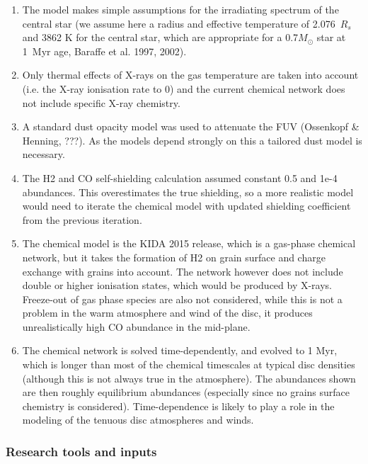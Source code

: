 \documentclass[10pt,fleqn,twoside]{article}
\newcommand{\Tcol}{\color{blue}}
\begin{document}
\begin{enumerate}
\item The model makes simple assumptions for the irradiating spectrum
of the central star (we assume here a radius and effective temperature
of 2.076~$R_s$ and 3862 K for the central star, which are appropriate
for a 0.7$M_{\odot}$ star at 1~Myr age, Baraffe et al. 1997, 2002).

\item Only thermal effects of X-rays on the gas
temperature are taken into account (i.e. the X-ray ionisation rate
to 0) and the current chemical network does not include specific
X-ray chemistry. 

\item A standard dust opacity model was used to attenuate
the FUV (Ossenkopf \& Henning, ???). As the models depend strongly on
this a tailored dust model is necessary. 

\item The H2 and CO self-shielding
calculation assumed constant 0.5 and 1e-4 abundances. This overestimates the true
shielding, so a more realistic model would need to iterate the
chemical model with updated shielding coefficient from the previous
iteration.

\item The chemical model is the KIDA 2015 release, which is a gas-phase
chemical network, but it takes the formation of H2 on grain surface and
charge exchange with grains into account. The network however does not
include double or higher ionisation states, which would be produced by
X-rays. Freeze-out of gas phase species are also not considered, while
this is not a problem in the warm atmosphere and wind of the disc, it produces
unrealistically high CO abundance in the mid-plane. 

\item The chemical network is solved time-dependently, and evolved to 1 Myr,
which is longer than most of the chemical timescales at typical disc
densities (although this is not always true in the atmosphere). The
abundances shown are then roughly equilibrium abundances (especially since no
grains surface chemistry is considered). Time-dependence is likely to
play a role in the modeling of the tenuous disc atmospheres and
winds. 
\end{enumerate}

\subsubsection{\Tcol Research tools and inputs}
\end{document}
